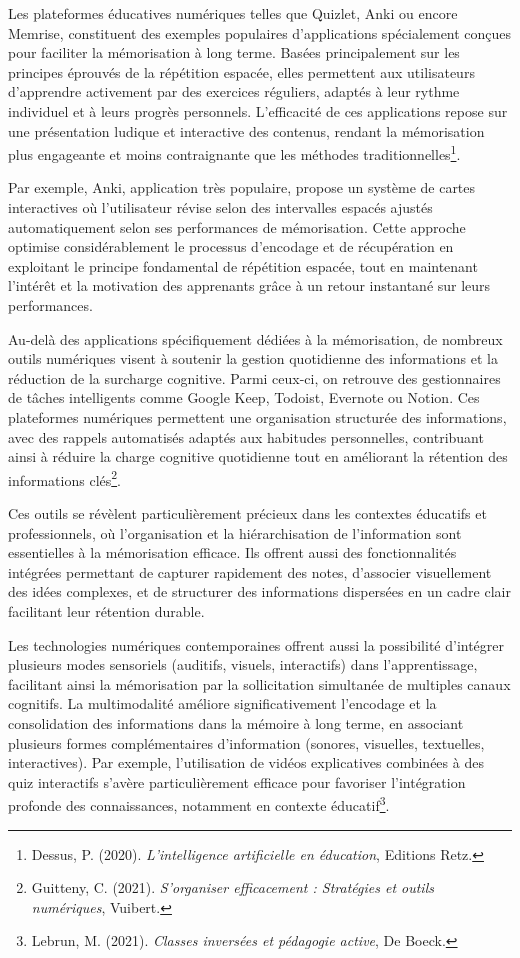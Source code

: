 \documentclass[12pt,a4paper]{report}
\begin{document}
Les plateformes éducatives numériques telles que Quizlet, Anki ou encore Memrise, constituent des exemples populaires d’applications spécialement conçues pour faciliter la mémorisation à long terme. Basées principalement sur les principes éprouvés de la répétition espacée, elles permettent aux utilisateurs d’apprendre activement par des exercices réguliers, adaptés à leur rythme individuel et à leurs progrès personnels. L'efficacité de ces applications repose sur une présentation ludique et interactive des contenus, rendant la mémorisation plus engageante et moins contraignante que les méthodes traditionnelles\footnote{Dessus, P. (2020). \textit{L'intelligence artificielle en éducation}, Editions Retz.}.

Par exemple, Anki, application très populaire, propose un système de cartes interactives où l’utilisateur révise selon des intervalles espacés ajustés automatiquement selon ses performances de mémorisation. Cette approche optimise considérablement le processus d’encodage et de récupération en exploitant le principe fondamental de répétition espacée, tout en maintenant l'intérêt et la motivation des apprenants grâce à un retour instantané sur leurs performances.

Au-delà des applications spécifiquement dédiées à la mémorisation, de nombreux outils numériques visent à soutenir la gestion quotidienne des informations et la réduction de la surcharge cognitive. Parmi ceux-ci, on retrouve des gestionnaires de tâches intelligents comme Google Keep, Todoist, Evernote ou Notion. Ces plateformes numériques permettent une organisation structurée des informations, avec des rappels automatisés adaptés aux habitudes personnelles, contribuant ainsi à réduire la charge cognitive quotidienne tout en améliorant la rétention des informations clés\footnote{Guitteny, C. (2021). \textit{S'organiser efficacement : Stratégies et outils numériques}, Vuibert.}.

Ces outils se révèlent particulièrement précieux dans les contextes éducatifs et professionnels, où l’organisation et la hiérarchisation de l’information sont essentielles à la mémorisation efficace. Ils offrent aussi des fonctionnalités intégrées permettant de capturer rapidement des notes, d'associer visuellement des idées complexes, et de structurer des informations dispersées en un cadre clair facilitant leur rétention durable.

Les technologies numériques contemporaines offrent aussi la possibilité d’intégrer plusieurs modes sensoriels (auditifs, visuels, interactifs) dans l’apprentissage, facilitant ainsi la mémorisation par la sollicitation simultanée de multiples canaux cognitifs. La multimodalité améliore significativement l’encodage et la consolidation des informations dans la mémoire à long terme, en associant plusieurs formes complémentaires d’information (sonores, visuelles, textuelles, interactives). Par exemple, l'utilisation de vidéos explicatives combinées à des quiz interactifs s’avère particulièrement efficace pour favoriser l’intégration profonde des connaissances, notamment en contexte éducatif\footnote{Lebrun, M. (2021). \textit{Classes inversées et pédagogie active}, De Boeck.}.
\end{document}
